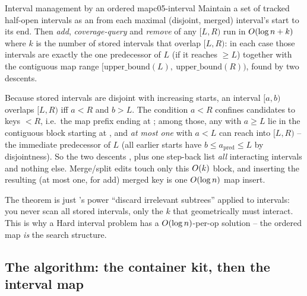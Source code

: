 \begin{theorem}{Interval management by an ordered map}{c05-interval}
Maintain a set of tracked half-open intervals as an  from each maximal (disjoint,
merged) interval's start to its end. Then \emph{add}, \emph{coverage-query} and \emph{remove} of any
$[L,R)$ run in $O(\log n + k)$ where $k$ is the number of stored intervals that overlap $[L,R)$:
in each case those intervals are exactly the one predecessor of $L$ (if it reaches $\ge L$) together
with the contiguous map range $[\text{upper\_bound}(L),\ \text{upper\_bound}(R))$, found by two
 descents.
\end{theorem}
\begin{proofbox}
Because stored intervals are disjoint with increasing starts, an interval $[a,b)$ overlaps $[L,R)$
iff $a<R$ and $b>L$. The condition $a<R$ confines candidates to keys $<R$, i.e.\ the map prefix ending
at ; among those, any with $a\ge L$ lie in the contiguous block starting at
, and \emph{at most one} with $a<L$ can reach into $[L,R)$ -- the immediate
predecessor of $L$ (all earlier starts have $b\le a_{\text{pred}}\le L$ by disjointness). So the two
descents ,  plus one step-back list \emph{all} interacting
intervals and nothing else. Merge/split edits touch only this $O(k)$ block, and inserting the
resulting (at most one, for add) merged key is one $O(\log n)$ map insert. \end{proofbox}
\begin{insightbox}
The theorem is just 's power ``discard irrelevant subtrees'' applied to intervals:
you never scan all stored intervals, only the $k$ that geometrically must interact. This is why a
Hard interval problem has a $O(\log n)$-per-op solution -- the ordered map \emph{is} the search
structure.
\end{insightbox}

\subsection{The algorithm: the container kit, then the interval map}

